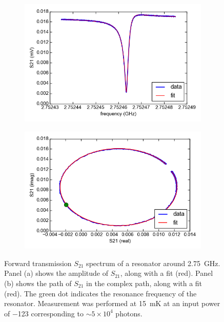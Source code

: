 \begin{figure}[h]
    \centering
    \begin{subfigure}[b]{.49\textwidth}
        \label{fig:resonator_amplitude}
        \includegraphics[width=\textwidth]{Figures/DRIE/resonator_amplitude.png}
    \end{subfigure}
    \begin{subfigure}[b]{.49\textwidth}
        \label{fig:resonator_complex}
        \includegraphics[width=\textwidth]{Figures/DRIE/resonator_complex.png}
    \end{subfigure}
    \caption{Forward transmission $S_{21}$ spectrum of a resonator around \SI{2.75}{\giga \hertz}. Panel (a) shows the amplitude of $S_{21}$, along with a fit (red). Panel (b) shows the path of $S_{21}$ in the complex path, along with a fit (red). The green dot indicates the resonance frequency of the resonator.  Measurement was performed at \SI{15}{\milli \kelvin} at an input power of \SI{-123}{\dBm} corresponding to $\sim 5 \times 10^4$ photons.}
    \label{fig:resonator}
\end{figure}

